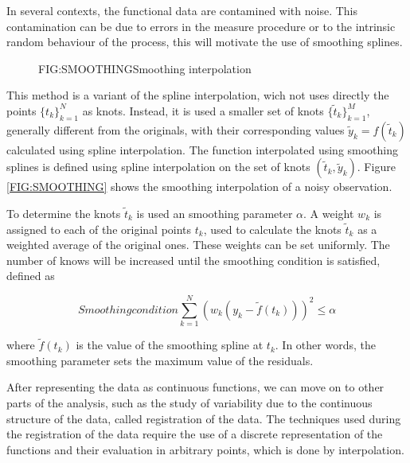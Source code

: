 
In several contexts, the functional data are contamined with noise.
This contamination can be due to errors in the measure procedure or to
the intrinsic random behaviour of the process,
this will motivate the use of smoothing splines.

\begin{figure}[Example of smoothing]{FIG:SMOOTHING}{Smoothing interpolation}
	 \quad
\end{figure}

This method is a variant of the spline interpolation, wich not
uses directly the points $\{t_k\}_{k=1}^{N}$ as knots. Instead, it is used a
smaller set of knots $\{\tilde t_k\}_{k=1}^{M}$, generally different from the
originals, with their corresponding values $\tilde y_k = f(\tilde t_k)$
calculated using spline interpolation. The function interpolated using smoothing
splines is defined using spline interpolation on the set of knots
$(\tilde t_k, \tilde y_k)$. Figure \ref{FIG:SMOOTHING} shows the smoothing
interpolation of a noisy observation.

To determine the knots $\tilde t_k$ is used an smoothing parameter $\alpha$.
A weight $w_k$ is assigned to each of the original points $t_k$, used to calculate
the knots $\tilde t_k$ as a weighted average of the original ones. These weights
can be set uniformly.
The number of knows will be increased until the smoothing condition is satisfied,
defined as

\begin{equation}[]{Smoothing condition}
\sum_{k=1}^N \left (  w_k \left (y_k - \tilde f(t_k) \right) \right)^2 \le \alpha
\end{equation}

where $\tilde f(t_k)$ is the value of the smoothing spline at $t_k$.
In other words, the smoothing parameter sets the maximum value of the residuals.

After representing the data as continuous functions, we can move on to other
parts of the analysis, such as the study of variability due to the continuous
structure of the data, called registration of the data. The techniques used
during the registration of the data require the use of a discrete
representation of the functions and their evaluation in arbitrary points,
which is done by interpolation.
